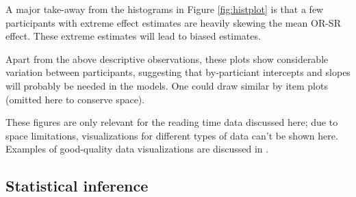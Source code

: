 \documentclass{ar-1col}\usepackage[]{graphicx}\usepackage[]{color}
\begin{document}
A major take-away from the histograms in Figure \ref{fig:histplot} is that  a few participants with extreme effect estimates are heavily skewing the mean OR-SR effect. These extreme estimates will lead to biased estimates.




Apart from the above descriptive observations, these plots show considerable variation between participants, suggesting that by-particiant intercepts and slopes will probably be needed in the models. One could draw similar by item plots (omitted here to conserve space).

These figures are only relevant for the reading time data discussed here; due to space limitations, visualizations for different types of data can't be shown here. Examples of good-quality data visualizations are discussed in \citet{wilke}.

\subsection{Statistical inference}
\end{document}
